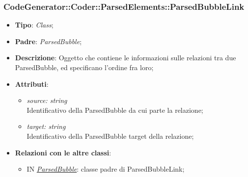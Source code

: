 \documentclass[../DefinizioneDiProdotto.tex]{subfiles}
\begin{document}
		\subsubsection{CodeGenerator::Coder::ParsedElements::ParsedBubbleLink}
		\hypertarget{SWEDesigner::Server::CodeGenerator::Coder::ParsedElements::ParsedBubbleLink}{}
		\begin{itemize}
			\item \textbf{Tipo}: \emph{Class};
			\item \textbf{Padre}: \emph{ParsedBubble};
			\item \textbf{Descrizione}: Oggetto che contiene le informazioni sulle relazioni tra due ParsedBubble, ed specificano l'ordine fra loro;
			\item \textbf{Attributi}:
			\begin{itemize}
				\item \emph{source: string} \\
				Identificativo della ParsedBubble da cui parte la relazione;
				\item \emph{target: string} \\
				Identificativo della ParsedBubble target della relazione;
			\end{itemize}
			\item \textbf{Relazioni con le altre classi}:	
			\begin{itemize}
				\item IN \hyperlink{SWEDesigner::Server::CodeGenerator::Coder::ParsedElements::ParsedBubble}{\emph{ParsedBubble}}: classe padre di ParsedBubbleLink; 
			\end{itemize}
		\end{itemize}
			
			
\end{document}
